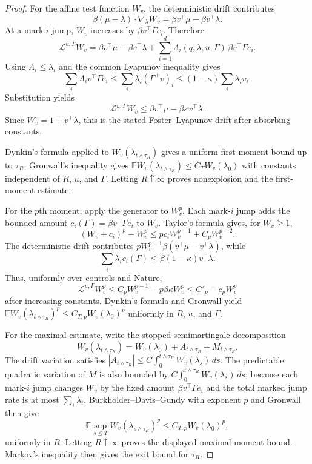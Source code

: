 \documentclass[11pt]{article}
\newcommand{\E}{\mathbb{E}}
\begin{document}
\begin{proof}
For the affine test function $W_v$, the deterministic drift contributes
\[
\beta(\mu-\lambda)\cdot\nabla_\lambda W_v
=\beta v^\top\mu-\beta v^\top\lambda.
\]
At a mark-$i$ jump, $W_v$ increases by
$\beta v^\top\Gamma e_i$. Therefore
\[
\mathcal L^{u,\Gamma}W_v
=\beta v^\top\mu-\beta v^\top\lambda
+\sum_{i=1}^d \Lambda_i(q,\lambda,u,\Gamma)\,\beta v^\top\Gamma e_i.
\]
Using $\Lambda_i\le\lambda_i$ and the common Lyapunov inequality gives
\[
\sum_i \Lambda_i v^\top\Gamma e_i
\le
\sum_i \lambda_i(\Gamma^\top v)_i
\le
(1-\kappa)\sum_i \lambda_i v_i.
\]
Substitution yields
\[
\mathcal L^{u,\Gamma}W_v
\le
\beta v^\top\mu-\beta\kappa v^\top\lambda.
\]
Since $W_v=1+v^\top\lambda$, this is the stated Foster--Lyapunov drift after
absorbing constants.

Dynkin's formula applied to $W_v(\lambda_{t\wedge\tau_R})$ gives a uniform
first-moment bound up to $\tau_R$. Gronwall's inequality gives
$\E W_v(\lambda_{t\wedge\tau_R})\le C_TW_v(\lambda_0)$ with constants
independent of $R$, $u$, and $\Gamma$. Letting $R\uparrow\infty$ proves
nonexplosion and the first-moment estimate.

For the $p$th moment, apply the generator to $W_v^p$. Each mark-$i$ jump adds
the bounded amount $c_i(\Gamma)=\beta v^\top\Gamma e_i$ to $W_v$. Taylor's
formula gives, for $W_v\ge1$,
\[
(W_v+c_i)^p-W_v^p\le p c_i W_v^{p-1}+C_p W_v^{p-2}.
\]
The deterministic drift contributes
$pW_v^{p-1}\beta(v^\top\mu-v^\top\lambda)$, while
\[
\sum_i\lambda_i c_i(\Gamma)\le \beta(1-\kappa)v^\top\lambda.
\]
Thus, uniformly over controls and Nature,
\[
\mathcal L^{u,\Gamma}W_v^p\le C_p W_v^{p-1}-p\beta\kappa W_v^p
\le C'_p-c_p W_v^p
\]
after increasing constants. Dynkin's formula and Gronwall yield
$\E W_v(\lambda_{t\wedge\tau_R})^p\le C_{T,p}W_v(\lambda_0)^p$ uniformly in
$R$, $u$, and $\Gamma$.

For the maximal estimate, write the
stopped semimartingale decomposition
\[
W_v(\lambda_{t\wedge\tau_R})
=W_v(\lambda_0)+A_{t\wedge\tau_R}+M_{t\wedge\tau_R}.
\]
The drift variation satisfies
$|A_{t\wedge\tau_R}|\le C\int_0^{t\wedge\tau_R}W_v(\lambda_s)\,ds$. The
predictable quadratic variation of $M$ is also bounded by
$C\int_0^{t\wedge\tau_R}W_v(\lambda_s)\,ds$, because each mark-$i$ jump changes
$W_v$ by the fixed amount $\beta v^\top\Gamma e_i$ and the total marked jump
rate is at most $\sum_i\lambda_i$. Burkholder--Davis--Gundy with exponent $p$
and Gronwall then
give
\[
\E\sup_{s\le T}W_v(\lambda_{s\wedge\tau_R})^p\le C_{T,p}W_v(\lambda_0)^p,
\]
uniformly in $R$. Letting $R\uparrow\infty$ proves the displayed maximal
moment bound.
Markov's inequality then gives the exit bound for $\tau_R$.


\end{proof}
\end{document}
